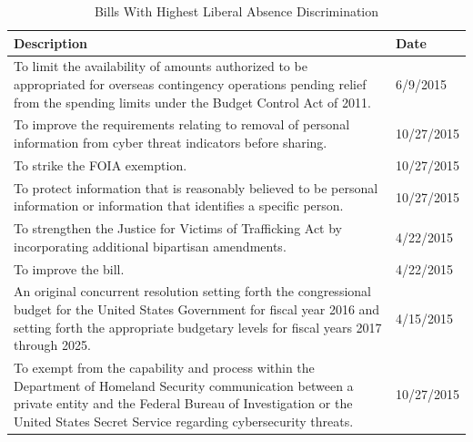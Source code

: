 \begin{table}[h!]
	\centering
	\caption{Bills With Highest Liberal Absence Discrimination}
	\label{lib_bills}
	\begin{tabular}{p{6in}l}
		Description                                                                                                                                                                                                                              & Date       \\
		\midrule
		To limit the availability of amounts authorized to be appropriated for overseas contingency operations pending relief from the spending limits under the Budget Control Act of 2011.                                                     & 6/9/2015   \\
		To improve the requirements relating to removal of personal information from cyber threat indicators before sharing.                                                                                                                     & 10/27/2015 \\
		To strike the FOIA exemption.                                                                                                                                                                                                            & 10/27/2015 \\
		To protect information that is reasonably believed to be personal information or information that identifies a specific person.                                                                                                          & 10/27/2015 \\
		To strengthen the Justice for Victims of Trafficking Act by incorporating additional bipartisan amendments.                                                                                                                              & 4/22/2015  \\
		To improve the bill.                                                                                                                                                                                                                     & 4/22/2015  \\
		An original concurrent resolution setting forth the congressional budget for the United States Government for fiscal year 2016 and setting forth the appropriate budgetary levels for fiscal years 2017 through 2025.                    & 4/15/2015  \\
		To exempt from the capability and process within the Department of Homeland Security communication between a private entity and the Federal Bureau of Investigation or the United States Secret Service regarding cybersecurity threats. & 10/27/2015 \\

\end{tabular}
\end{table}
